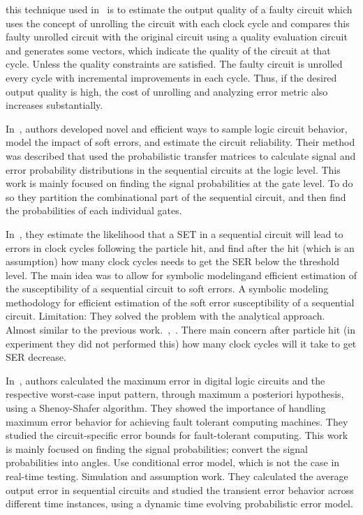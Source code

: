 this technique  used in~\cite{ranjan2014aslan} is to estimate the output quality of a faulty circuit which uses the concept
of unrolling the circuit with each clock cycle and compares this faulty unrolled circuit with the original circuit
using a quality evaluation circuit and generates some vectors, which indicate the quality of the circuit
at that cycle. Unless the quality constraints are satisfied. The faulty circuit is unrolled every cycle with incremental improvements in each cycle. Thus,
if the desired output quality is high, the cost of unrolling and analyzing error metric also increases
substantially.

In~\cite{yu2010scalable}, authors developed novel and efficient ways to sample logic circuit behavior,
model the impact of soft errors, and estimate the circuit reliability. Their method was described that
used the probabilistic transfer matrices to calculate signal and error probability distributions in the
sequential circuits at the logic level. This work is mainly focused on finding the signal probabilities at the gate level. To do so
they partition the combinational part of the sequential circuit, and then find the probabilities of each
individual gates.


In~\cite{miskov2007mars},  they estimate the likelihood that a SET in a sequential circuit will lead to errors
in clock cycles following the particle hit, and find after the hit (which is an assumption) how many clock
cycles needs to get the SER below the threshold level. The main idea was to allow for symbolic modelingand efficient estimation of the susceptibility of a sequential circuit to soft errors. A symbolic modeling
methodology for efficient estimation of the soft error susceptibility of a sequential circuit.
Limitation: They solved the problem with the analytical approach. Almost similar to the previous work.~\cite{miskov2007mars},~\cite{miskov2008modeling}. There main concern after particle hit (in experiment they did not performed this) how many
clock cycles will it take to get SER decrease.




In~\cite{lingasubramanian2010probabilistic}, authors calculated the maximum error in digital logic circuits and the respective
worst-case input pattern, through maximum a posteriori hypothesis, using a Shenoy-Shafer algorithm.
They showed the importance of handling maximum error behavior for achieving fault tolerant
computing machines. They studied the circuit-specific error bounds for fault-tolerant computing. This work is mainly focused on finding the signal probabilities; convert the signal
probabilities into angles. Use conditional error model, which is not the case in real-time testing.
Simulation and assumption work. They calculated the average output error in sequential circuits and
studied the transient error behavior across different time instances, using a dynamic time evolving
probabilistic error model.

